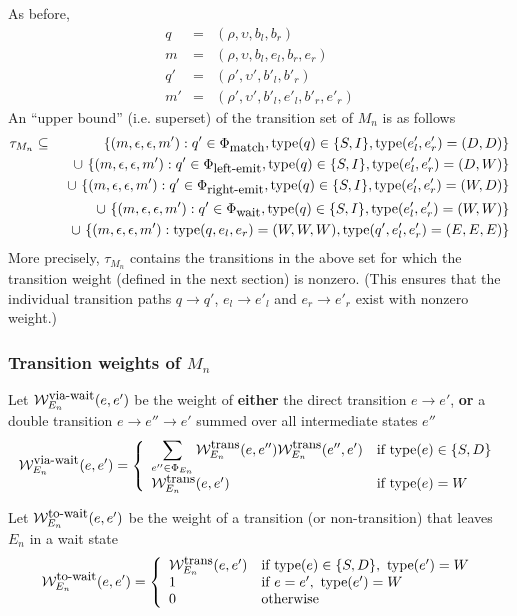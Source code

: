 \documentclass{article}
\newcommand\States{\Phi}
\newcommand\statesof[1]{\States_{#1}}
\newcommand\Transitions{\tau}
\newcommand\transitionsof[1]{\Transitions_{#1}}
\newcommand\weight{{\cal W}}
\newcommand\weightfunof[1]{\weight_{#1}}
\newcommand\transweightfun[1]{\weightfunof{#1}^{\mbox{\small trans}}}
\newcommand\transviawait[1]{\weightfunof{#1}^{\mbox{\small via-wait}}}
\newcommand\transtowait[1]{\weightfunof{#1}^{\mbox{\small to-wait}}}
\newcommand\statetype{\mbox{type}}
\newcommand\stateset[1]{\statesof{\mbox{\small #1}}}
\newcommand\waitsuffix{wait}
\newcommand\waitstates{\stateset{\waitsuffix}}
\newcommand\mstate{(\rho,\upsilon,b_l,e_l,b_r,e_r)}
\newcommand\mstatedest{(\rho',\upsilon',b'_l,e'_l,b'_r,e'_r)}
\newcommand\qstate{(\rho,\upsilon,b_l,b_r)}
\newcommand\qstatedest{(\rho',\upsilon',b'_l,b'_r)}
\newcommand\matchsuffix{match}
\newcommand\leftemitsuffix{left-emit}
\newcommand\rightemitsuffix{right-emit}
\newcommand\matchstates{\stateset{\matchsuffix}}
\newcommand\leftemitstates{\stateset{\leftemitsuffix}}
\newcommand\rightemitstates{\stateset{\rightemitsuffix}}
\begin{document}
As before,
\begin{eqnarray*}
q & = & \qstate \\
m & = & \mstate \\
q' & = & \qstatedest \\
m' & = & \mstatedest
\end{eqnarray*}
An ``upper bound'' (i.e. superset) of the transition set of $M_n$ is as follows
\begin{eqnarray*}
\transitionsof{M_n} & \subseteq & \{ (m,\epsilon,\epsilon,m'): q'\in\matchstates,\statetype(q)\in\{S,I\},\statetype(e'_l,e'_r)=(D,D) \} \\
 & & \ \cup\ \{ (m,\epsilon,\epsilon,m'): q'\in\leftemitstates,\statetype(q)\in\{S,I\},\statetype(e'_l,e'_r)=(D,W) \} \\
 & & \ \cup\ \{ (m,\epsilon,\epsilon,m'): q'\in\rightemitstates,\statetype(q)\in\{S,I\},\statetype(e'_l,e'_r)=(W,D) \} \\
 & & \ \cup\ \{ (m,\epsilon,\epsilon,m'): q'\in\waitstates,\statetype(q)\in\{S,I\},\statetype(e'_l,e'_r)=(W,W) \} \\
 & & \ \cup\ \{ (m,\epsilon,\epsilon,m'): \statetype(q,e_l,e_r)=(W,W,W),\statetype(q',e'_l,e'_r)=(E,E,E) \}
\end{eqnarray*}
More precisely, $\transitionsof{M_n}$ contains the transitions in the above set for which the transition weight (defined in the next section) is nonzero.
(This ensures that the individual transition paths $q \to q'$, $e_l \to e'_l$ and $e_r \to e'_r$ exist with nonzero weight.)

\subsubsection{Transition weights of $M_n$}

Let $\transviawait{E_n}(e,e')$ be the weight of {\bf either} the direct transition $e \to e'$,
{\bf or} a double transition $e \to e'' \to e'$ summed over all intermediate states $e''$
\[
\transviawait{E_n}(e,e') = \left\{
\begin{array}{ll}
\displaystyle
\sum_{e'' \in \statesof{E_n}}
\transweightfun{E_n}(e,e'')
\transweightfun{E_n}(e'',e')
& \mbox{if $\statetype(e) \in \{S,D\}$} \\
\transweightfun{E_n}(e,e')
& \mbox{if $\statetype(e) = W$} \\
\end{array}
\right.
\]

Let $\transtowait{E_n}(e,e')$ be the weight of a transition (or non-transition) that leaves $E_n$ in a wait state
\[
\transtowait{E_n}(e,e') = \left\{
\begin{array}{ll}
\transweightfun{E_n}(e,e')
& \mbox{if $\statetype(e) \in \{S,D\},\ \statetype(e') = W$} \\
1
& \mbox{if $e=e',\ \statetype(e') = W$} \\
0
& \mbox{otherwise} \\
\end{array}
\right.
\]
\end{document}
